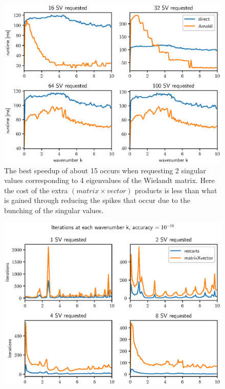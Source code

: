 \documentclass[a4paper, oneside]{discothesis}
\begin{document}
\begin{figure} [H]
	\centering
	\includegraphics[width=0.9\columnwidth]{figures/arnoldi_time_1e-16_2.eps}
	\caption{
		The best speedup of about 15 occurs when requesting 2 singular values corresponding to 4 eigenvalues of the Wielandt matrix. 
		Here the cost of the extra $(matrix\times vector)$ products is less than what is gained through reducing the spikes that occur due to the bunching of the singular values.
	}
	\label{fig:arnoldi_time_1e-16_2}
\end{figure}
\begin{figure} [H]
	\centering
	\includegraphics[width=0.9\columnwidth]{figures/arnoldi_iter_1e-16_1.eps}
	\label{fig:arnoldi_iter_1e-16_1}
\end{figure}
\end{document}
